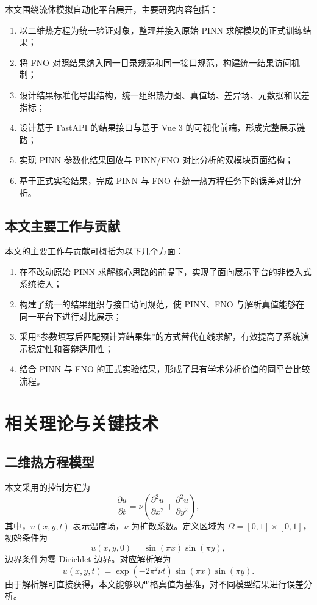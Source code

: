 \documentclass[UTF8,zihao=-4]{oucart}
\begin{document}
本文围绕流体模拟自动化平台展开，主要研究内容包括：
\begin{enumerate}[label=\arabic*)]
  \item 以二维热方程为统一验证对象，整理并接入原始 PINN 求解模块的正式训练结果；
  \item 将 FNO 对照结果纳入同一目录规范和同一接口规范，构建统一结果访问机制；
  \item 设计结果标准化导出结构，统一组织热力图、真值场、差异场、元数据和误差指标；
  \item 设计基于 FastAPI 的结果接口与基于 Vue 3 的可视化前端，形成完整展示链路；
  \item 实现 PINN 参数化结果回放与 PINN/FNO 对比分析的双模块页面结构；
  \item 基于正式实验结果，完成 PINN 与 FNO 在统一热方程任务下的误差对比分析。
\end{enumerate}

\subsection{本文主要工作与贡献}

本文的主要工作与贡献可概括为以下几个方面：
\begin{enumerate}[label=\arabic*)]
  \item 在不改动原始 PINN 求解核心思路的前提下，实现了面向展示平台的非侵入式系统接入；
  \item 构建了统一的结果组织与接口访问规范，使 PINN、FNO 与解析真值能够在同一平台下进行对比展示；
  \item 采用“参数填写后匹配预计算结果集”的方式替代在线求解，有效提高了系统演示稳定性和答辩适用性；
  \item 结合 PINN 与 FNO 的正式实验结果，形成了具有学术分析价值的同平台比较流程。
\end{enumerate}

\section{相关理论与关键技术}

\subsection{二维热方程模型}

本文采用的控制方程为
\begin{equation}
\frac{\partial u}{\partial t}=\nu\left(\frac{\partial^2u}{\partial x^2}+\frac{\partial^2u}{\partial y^2}\right),
\end{equation}
其中，$u(x,y,t)$ 表示温度场，$\nu$ 为扩散系数。定义区域为 $\Omega=[0,1]\times[0,1]$，初始条件为
\begin{equation}
u(x,y,0)=\sin(\pi x)\sin(\pi y),
\end{equation}
边界条件为零 Dirichlet 边界。对应解析解为
\begin{equation}
u(x,y,t)=\exp(-2\pi^2\nu t)\sin(\pi x)\sin(\pi y).
\end{equation}
由于解析解可直接获得，本文能够以严格真值为基准，对不同模型结果进行误差分析。
\end{document}
